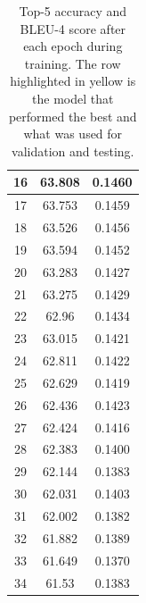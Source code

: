 \documentclass[11pt,a4paper]{article}
\begin{document}
\begin{table}
\begin{tabular}{|c|c|c|}
\hline
16                                                & 63.808                  & 0.1460           \\ 
\hline
17                                                & 63.753                  & 0.1459           \\ 
\hline
18                                                & 63.526                  & 0.1456           \\ 
\hline
19                                                & 63.594                  & 0.1452           \\ 
\hline
20                                                & 63.283                  & 0.1427           \\ 
\hline
21                                                & 63.275                  & 0.1429           \\ 
\hline
22                                                & 62.96                   & 0.1434           \\ 
\hline
23                                                & 63.015                  & 0.1421           \\ 
\hline
24                                                & 62.811                  & 0.1422           \\ 
\hline
25                                                & 62.629                  & 0.1419           \\ 
\hline
26                                                & 62.436                  & 0.1423           \\ 
\hline
27                                                & 62.424                  & 0.1416           \\ 
\hline
28                                                & 62.383                  & 0.1400           \\ 
\hline
29                                                & 62.144                  & 0.1383           \\ 
\hline
30                                                & 62.031                  & 0.1403           \\ 
\hline
31                                                & 62.002                  & 0.1382           \\ 
\hline
32                                                & 61.882                  & 0.1389           \\ 
\hline
33                                                & 61.649                  & 0.1370           \\ 
\hline
34                                                & 61.53                   & 0.1383           \\
\hline
\end{tabular}
\caption{\label{trainingdata}Top-5 accuracy and BLEU-4 score after each epoch during training. The row highlighted in yellow is the model that performed the best and what was used for validation and testing.}
\end{table}
\end{document}
